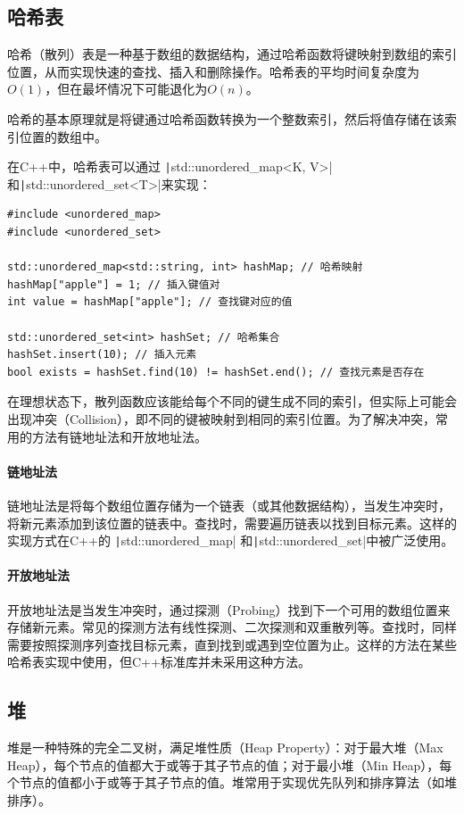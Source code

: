 \subsection{哈希表}

哈希（散列）表是一种基于数组的数据结构，通过哈希函数将键映射到数组的索引位置，从而实现快速的查找、插入和删除操作。哈希表的平均时间复杂度为$O(1)$，但在最坏情况下可能退化为$O(n)$。

哈希的基本原理就是将键通过哈希函数转换为一个整数索引，然后将值存储在该索引位置的数组中。

在C++中，哈希表可以通过 \texttt|std::unordered_map<K, V>| 和\texttt|std::unordered_set<T>|来实现：
\begin{verbatim}
#include <unordered_map>
#include <unordered_set>

std::unordered_map<std::string, int> hashMap; // 哈希映射
hashMap["apple"] = 1; // 插入键值对
int value = hashMap["apple"]; // 查找键对应的值

std::unordered_set<int> hashSet; // 哈希集合
hashSet.insert(10); // 插入元素
bool exists = hashSet.find(10) != hashSet.end(); // 查找元素是否存在
\end{verbatim}

在理想状态下，散列函数应该能给每个不同的键生成不同的索引，但实际上可能会出现冲突（Collision），即不同的键被映射到相同的索引位置。为了解决冲突，常用的方法有链地址法和开放地址法。

\paragraph{链地址法}
链地址法是将每个数组位置存储为一个链表（或其他数据结构），当发生冲突时，将新元素添加到该位置的链表中。查找时，需要遍历链表以找到目标元素。这样的实现方式在C++的 \texttt|std::unordered_map| 和\texttt|std::unordered_set|中被广泛使用。

\paragraph{开放地址法} 
开放地址法是当发生冲突时，通过探测（Probing）找到下一个可用的数组位置来存储新元素。常见的探测方法有线性探测、二次探测和双重散列等。查找时，同样需要按照探测序列查找目标元素，直到找到或遇到空位置为止。这样的方法在某些哈希表实现中使用，但C++标准库并未采用这种方法。

\subsection{堆}
堆是一种特殊的完全二叉树，满足堆性质（Heap Property）：对于最大堆（Max Heap），每个节点的值都大于或等于其子节点的值；对于最小堆（Min Heap），每个节点的值都小于或等于其子节点的值。堆常用于实现优先队列和排序算法（如堆排序）。

